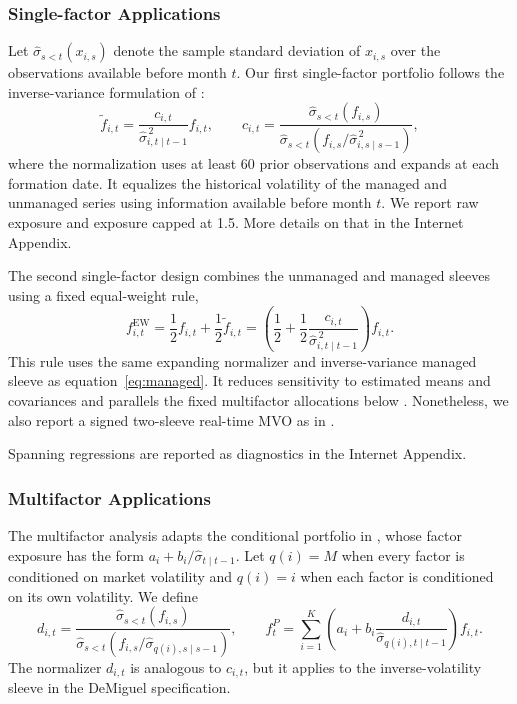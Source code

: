 \documentclass[preprint,12pt,authoryear]{elsarticle}
\begin{document}
\subsubsection{Single-factor Applications}
Let $\widehat{\sigma}_{s<t}(x_{i,s})$ denote the sample standard deviation of $x_{i,s}$ over the observations available before month $t$. Our first single-factor portfolio follows the inverse-variance formulation of \citet{moreiramuir2017}:
\begin{equation}
	\widetilde{f}_{i,t} =
	\frac{c_{i,t}}{\widehat{\sigma}^{\,2}_{i,t\mid t-1}}f_{i,t},
	\qquad
	c_{i,t}=\frac{\widehat{\sigma}_{s<t}(f_{i,s})}
	{\widehat{\sigma}_{s<t}\!\left(f_{i,s}/\widehat{\sigma}^{\,2}_{i,s\mid s-1}\right)},
	\label{eq:managed}
\end{equation}
where the normalization uses at least 60 prior observations and expands at each formation date. It equalizes the historical volatility of the managed and unmanaged series using information available before month $t$. We report raw exposure and exposure capped at 1.5. More details on that in the Internet Appendix.

The second single-factor design combines the unmanaged and managed sleeves using a fixed equal-weight rule,
\begin{equation}
	f^{\mathrm{EW}}_{i,t}
	=\frac{1}{2}f_{i,t}+\frac{1}{2}\widetilde{f}_{i,t}
	=\left(\frac{1}{2}+\frac{1}{2}
	\frac{c_{i,t}}{\widehat{\sigma}^{\,2}_{i,t\mid t-1}}\right)f_{i,t}.
	\label{eq:cederburg-ew}
\end{equation}
This rule uses the same expanding normalizer and inverse-variance managed sleeve as equation~\eqref{eq:managed}. It reduces sensitivity to estimated means and covariances and parallels the fixed multifactor allocations below \citep{demiguelgarlappiuppal2009}. Nonetheless, we also report a signed two-sleeve real-time MVO as in \citet{cederburg2020}.

Spanning regressions are reported as diagnostics in the Internet Appendix.

\subsubsection{Multifactor Applications}

The multifactor analysis adapts the conditional portfolio in \citet{demiguelmartinutrerauppal2024}, whose factor exposure has the form $a_i+b_i/\widehat{\sigma}_{t\mid t-1}$. Let $q(i)=M$ when every factor is conditioned on market volatility and $q(i)=i$ when each factor is conditioned on its own volatility. We define
\begin{equation}
d_{i,t}=\frac{\widehat{\sigma}_{s<t}(f_{i,s})}
{\widehat{\sigma}_{s<t}\!\left(f_{i,s}/\widehat{\sigma}_{q(i),s\mid s-1}\right)},
\qquad
f^{P}_{t}=\sum_{i=1}^{K}
\left(a_i+b_i\frac{d_{i,t}}
{\widehat{\sigma}_{q(i),t\mid t-1}}\right)f_{i,t}.
\label{eq:multifactor}
\end{equation}
The normalizer $d_{i,t}$ is analogous to $c_{i,t}$, but it applies to the inverse-volatility sleeve in the DeMiguel specification.
\end{document}
